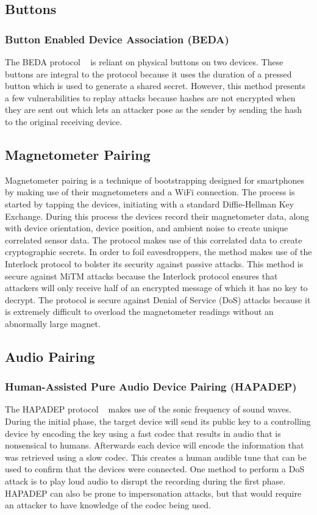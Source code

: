 \subsection{Buttons}
\subsubsection{Button Enabled Device Association (BEDA)}
The BEDA protocol ~\cite{soriente2007beda} is reliant on physical buttons on two devices.
These buttons are integral to the protocol because it uses the duration of a pressed button which is used to generate a shared secret.
However, this method presents a few vulnerabilities to replay attacks because hashes are not encrypted when they are sent out which lets an attacker pose as the sender by sending the hash to the original receiving device.

\subsection{Magnetometer Pairing}
Magnetometer pairing is a technique of bootstrapping designed for smartphones by making use of their magnetometers and a WiFi connection. The process is started by tapping the devices, initiating with a standard Diffie-Hellman Key Exchange. During this process the devices record their magnetometer data, along with device orientation, device position, and ambient noise to create unique correlated sensor data. The protocol makes use of this correlated data to create cryptographic secrets. In order to foil eavesdroppers, the method makes use of the Interlock protocol to bolster its security against passive attacks. This method is secure against MiTM attacks because the Interlock protocol ensures that attackers will only receive half of an encrypted message of which it has no key to decrypt. The protocol is secure against Denial of Service (DoS) attacks because it is extremely difficult to overload the magnetometer readings without an abnormally large magnet.

\subsection{Audio Pairing}
\subsubsection{Human-Assisted Pure Audio Device Pairing (HAPADEP)}
The HAPADEP protocol ~\cite{soriente2008hapadep} makes use of the sonic frequency of sound waves. During the initial phase, the target device will send its public key to a controlling device by encoding the key using a fast codec that results in audio that is nonsensical to humans. Afterwards each device will encode the information that was retrieved using a slow codec. This creates a human audible tune that can be used to confirm that the devices were connected. One method to perform a DoS attack is to play loud audio to disrupt the recording during the first phase. HAPADEP can also be prone to impersonation attacks, but that would require an attacker to have knowledge of the codec being used. 

